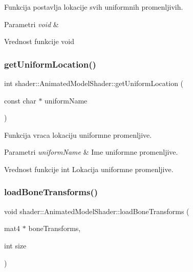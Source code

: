 Funkcija postavlja lokacije svih uniformnih promenljivih. 


\begin{DoxyParams}{Parametri}
{\em void} & \\
\hline
\end{DoxyParams}
\begin{DoxyReturn}{Vrednost funkcije}
void 
\end{DoxyReturn}
\mbox{\label{classshader_1_1AnimatedModelShader_a4977309c28777e27a5d3f617336e4010}} 
\subsubsection{\texorpdfstring{get\+Uniform\+Location()}{getUniformLocation()}}
{\footnotesize\ttfamily int shader\+::\+Animated\+Model\+Shader\+::get\+Uniform\+Location (\begin{DoxyParamCaption}\item[{const char $\ast$}]{uniform\+Name }\end{DoxyParamCaption})}



Funkcija vraca lokaciju uniformne promenljive. 


\begin{DoxyParams}{Parametri}
{\em uniform\+Name} & Ime uniformne promenljive. \\
\hline
\end{DoxyParams}
\begin{DoxyReturn}{Vrednost funkcije}
int Lokacija uniformne promenljive. 
\end{DoxyReturn}
\mbox{\label{classshader_1_1AnimatedModelShader_a6eaa2eee5a75b0c26216cd9308d060d5}} 
\subsubsection{\texorpdfstring{load\+Bone\+Transforms()}{loadBoneTransforms()}}
{\footnotesize\ttfamily void shader\+::\+Animated\+Model\+Shader\+::load\+Bone\+Transforms (\begin{DoxyParamCaption}\item[{mat4 $\ast$}]{bone\+Transforms,  }\item[{int}]{size }\end{DoxyParamCaption})}



